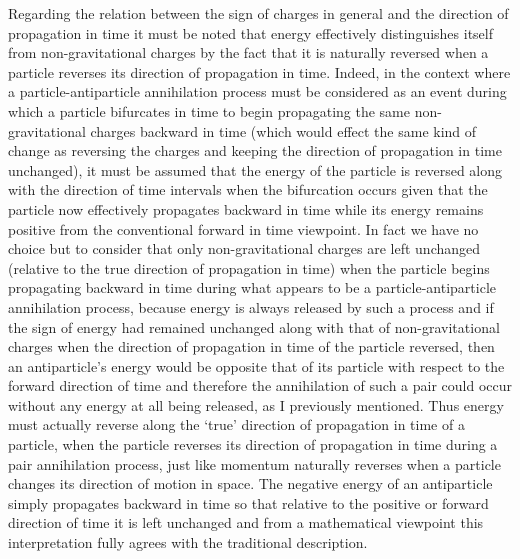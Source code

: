 \documentclass[notitlepage,12pt]{report}
\begin{document}
\bigskip

\noindent Regarding the relation between the sign of charges in general and the direction of propagation in time it must be noted that energy effectively distinguishes itself from non-gravitational charges by the fact that it is naturally reversed when a particle reverses its direction of propagation in time. Indeed, in the context where a particle-antiparticle annihilation process must be considered as an event during which a particle bifurcates in time to begin propagating the same non-gravitational charges backward in time (which would effect the same kind of change as reversing the charges and keeping the direction of propagation in time unchanged), it must be assumed that the energy of the particle is reversed along with the direction of time intervals when the bifurcation occurs given that the particle now effectively propagates backward in time while its energy remains positive from the conventional forward in time viewpoint. In fact we have no choice but to consider that only non-gravitational charges are left unchanged (relative to the true direction of propagation in time) when the particle begins propagating backward in time during what appears to be a particle-antiparticle annihilation process, because energy is always released by such a process and if the sign of energy had remained unchanged along with that of non-gravitational charges when the direction of propagation in time of the particle reversed, then an antiparticle's energy would be opposite that of its particle with respect to the forward direction of time and therefore the annihilation of such a pair could occur without any energy at all being released, as I previously mentioned. Thus energy must actually reverse along the `true' direction of propagation in time of a particle, when the particle reverses its direction of propagation in time during a pair annihilation process, just like momentum naturally reverses when a particle changes its direction of motion in space. The negative energy of an antiparticle simply propagates backward in time so that relative to the positive or forward direction of time it is left unchanged and from a mathematical viewpoint this interpretation fully agrees with the traditional description.
\end{document}

